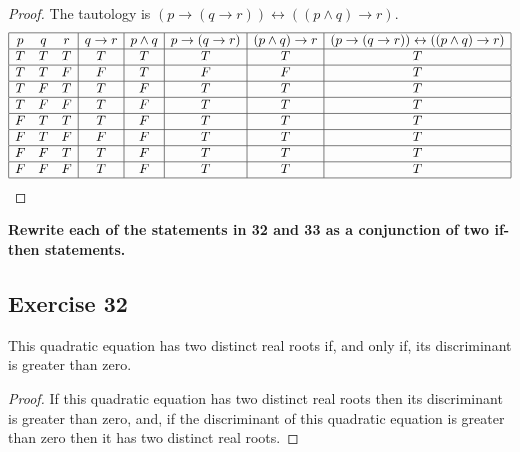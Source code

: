 \documentclass[14pt]{extarticle}
\newcommand{\bic}{\leftrightarrow}
\begin{document}
\begin{proof}
    The tautology is $(p \to (q \to r)) \bic ((p \wedge q) \to r)$. $$
        \begin{array}{|ccc|c|c|c|c|c|}
            \hline
            p & q & r & q \to r & p \wedge q & p \to (q \to r) & (p \wedge q) \to r & (p \to (q \to r)) \bic ((p \wedge q) \to r) \\
            \hline
            T & T & T & T       & T          & T               & T                  & T                                           \\
            \hline
            T & T & F & F       & T          & F               & F                  & T                                           \\
            \hline
            T & F & T & T       & F          & T               & T                  & T                                           \\
            \hline
            T & F & F & T       & F          & T               & T                  & T                                           \\
            \hline
            F & T & T & T       & F          & T               & T                  & T                                           \\
            \hline
            F & T & F & F       & F          & T               & T                  & T                                           \\
            \hline
            F & F & T & T       & F          & T               & T                  & T                                           \\
            \hline
            F & F & F & T       & F          & T               & T                  & T                                           \\
            \hline
        \end{array}
    $$
\end{proof}

{\bf Rewrite each of the statements in 32 and 33 as a conjunction of two if-then statements.}

\subsection{Exercise 32}
This quadratic equation has two distinct real roots if, and only if, its discriminant is greater than zero.

\begin{proof}
    If this quadratic equation has two distinct real roots then its discriminant is greater than zero, and, if the discriminant of this quadratic equation is greater than zero then it has two distinct real roots.
\end{proof}
\end{document}
